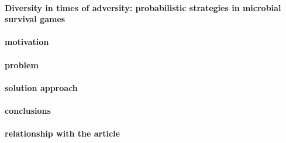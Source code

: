 \documentclass{article}
\begin{document}
\paragraph{Diversity in times of adversity: probabilistic strategies in microbial survival games\cite{denise_m._wolf_diversity_2005}}

\paragraph{motivation}
\paragraph{problem}
\paragraph{solution approach}
\paragraph{conclusions}
\paragraph{relationship with the article}



\end{document}

